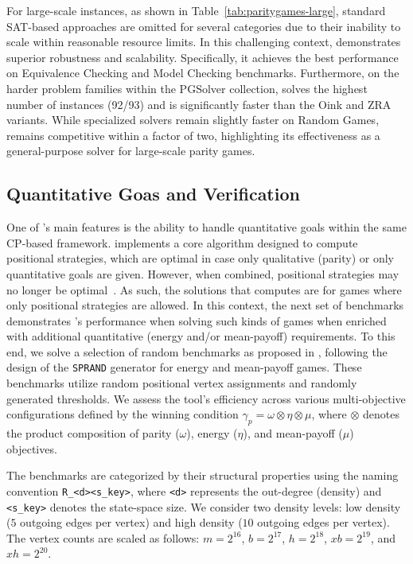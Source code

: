 \documentclass[a4paper,UKenglish,cleveref, autoref, thm-restate, anonymous]{lipics-v2021}
\begin{document}
For large-scale instances, as shown in Table~\ref{tab:paritygames-large}, standard SAT-based approaches are omitted for several categories due to their inability to scale within reasonable resource limits. In this challenging context, \nocq demonstrates superior robustness and scalability. Specifically, it achieves the best performance on Equivalence Checking and Model Checking benchmarks. Furthermore, on the harder problem families within the PGSolver collection, \nocq solves the highest number of instances (92/93) and is significantly faster than the Oink and ZRA variants. While specialized solvers remain slightly faster on Random Games, \nocq remains competitive within a factor of two, highlighting its effectiveness as a general-purpose solver for large-scale parity games.

\subsection{Quantitative Goas and Verification}

One of \nocq's main features is the ability to handle quantitative goals within the same CP-based framework. 
%
\nocq implements a core algorithm designed to compute positional strategies, which are optimal in case only qualitative (parity) or only quantitative goals are given. However, when combined, positional strategies may no longer be optimal~\cite{ChatterjeeHJ05,Chatterjee:2010}. As such, the solutions that \nocq computes are for games where only positional strategies are allowed. 
%
In this context, the next set of benchmarks demonstrates \nocq's performance when solving such kinds of games when enriched with additional quantitative (energy and/or mean-payoff) requirements.  
%
To this end, we solve a selection of random benchmarks as proposed in \cite{Chaloupka:2011}, following the design of the \texttt{SPRAND} generator \cite{CherkasskyBoris:1996} for energy and mean-payoff games. These benchmarks utilize random positional vertex assignments and randomly generated thresholds. We assess the tool's efficiency across various multi-objective configurations defined by the winning condition $\gamma_{p} = \omega \otimes \eta \otimes \mu$, where $\otimes$ denotes the product composition of parity ($\omega$), energy ($\eta$), and mean-payoff ($\mu$) objectives.

The benchmarks are categorized by their structural properties using the naming convention \texttt{R\_<d><s\_key>}, where \texttt{<d>} represents the out-degree (density) and \texttt{<s\_key>} denotes the state-space size. We consider two density levels: low density ($5$ outgoing edges per vertex) and high density ($10$ outgoing edges per vertex). The vertex counts are scaled as follows: $m = 2^{16}$, $b = 2^{17}$, $h = 2^{18}$, $xb = 2^{19}$, and $xh = 2^{20}$.
\end{document}
